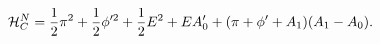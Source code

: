 \begin{equation}
  {\cal{H}}^N_C = \frac{1}{2} \pi^2 + \frac{1}{2}\phi'^2 +
  \frac{1}{2}E^2 + EA'_0 + (\pi + \phi' + A_1)(A_1 - A_0).
  \label{a62}
  \end{equation}

